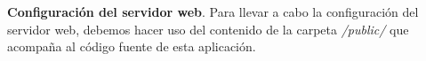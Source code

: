 \item \textbf{Configuración del servidor web}.
   Para llevar a cabo la configuración del servidor web, debemos hacer uso del
   contenido de la carpeta \textit{/public/} que acompaña al código fuente de
   esta aplicación.
